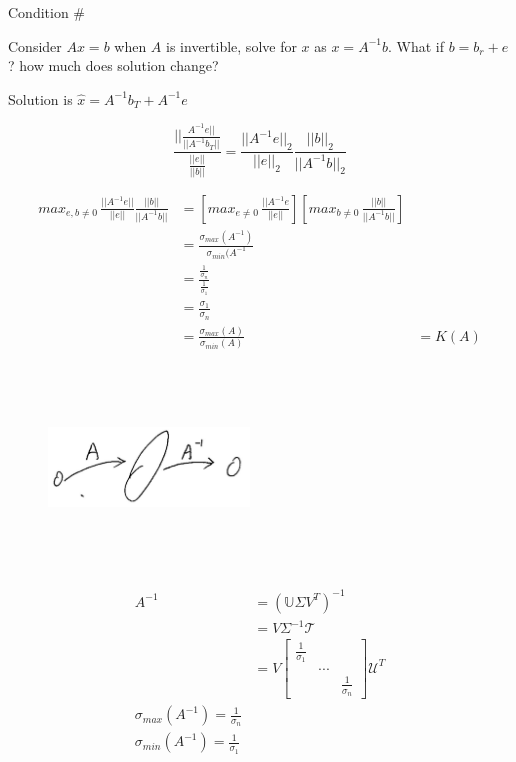 Condition \#

Consider $Ax = b$ when $A$ is invertible, solve for $x$ as $x = A^{-1}b$. What if $b = b_r + e$? how much does solution change? 

Solution is $\hat{x} = A^{-1}b_T + A^{-1}e$

\begin{equation*}
\frac{||\frac{A^{-1}e||}{||A^{-1}b_T||}}{\frac{||e||}{||b||}} = \frac{||A^{-1}e||_2}{||e||_2} \frac{||b||_2}{||A^{-1}b||_2}
\end{equation*}

\begin{align*}
max_{e,b\neq 0} \, \frac{||A^{-1}e||}{||e||} \frac{||b||}{||A^{-1}b||} &= \left[max_{e\neq 0}\, \frac{||A^{-1}e}{||e||}\right]\left[max_{b\neq 0}\, \frac{||b||}{||A^{-1}b||}\right]\\
&= \frac{\sigma_{max}(A^{-1})}{\sigma_{min}(A^{-1}}\\
&= \frac{\frac{1}{\sigma_n}}{\frac{1}{\sigma_1}}\\
&= \frac{\sigma_1}{\sigma_n}\\
&= \frac{\sigma_{max}(A)}{\sigma_{min}(A)}
&= K(A)
\end{align*}

\begin{figure}
	\centering
	\includegraphics[width=2.1in,height=2.1in]{figures/ch05/figure2.jpg}
\end{figure}

\begin{align}
A^{-1} &= (\mathbb{U}\Sigma V^T)^{-1} \\
&= V\Sigma^{-1}\mathcal{T}\\
&= V
\begin{bmatrix}
\frac{1}{\sigma_1} & &\\
& ... & \\
& & \frac{1}{\sigma_n}
\end{bmatrix}
\mathcal{U}^T\\
\sigma_{max}(A^{-1}) = \frac{1}{\sigma_n}\\
\sigma_{min}(A^{-1}) = \frac{1}{\sigma_1}
\end{align}

